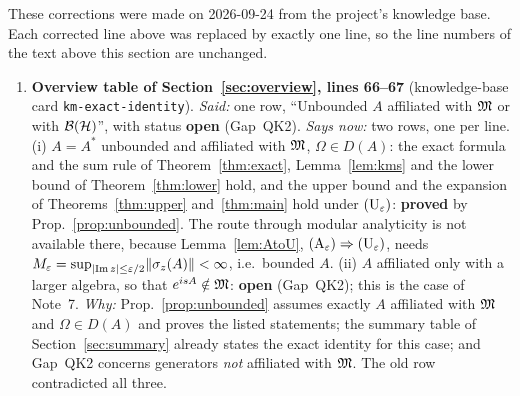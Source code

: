 \documentclass[11pt]{article}
\newcommand{\Hil}{\mathcal H}\newcommand{\Om}{\Omega}
\begin{document}
These corrections were made on 2026-09-24 from the project's knowledge base.  Each corrected line
above was replaced by exactly one line, so the line numbers of the text above this section are
unchanged.

\begin{enumerate}[leftmargin=2.4em,itemsep=4pt]
\item[\textbf{C1.}] \textbf{Overview table of Section~\ref{sec:overview}, lines 66--67}
 (knowledge-base card \texttt{km-exact-identity}).
 \emph{Said:} one row, ``Unbounded \(A\) affiliated with \(\mathfrak M\) or with \(\cB(\Hil)\)'', with
 status \textbf{open} (Gap~QK2).
 \emph{Says now:} two rows, one per line.  (i) \(A=A^*\) unbounded and affiliated with \(\mathfrak M\),
 \(\Om\in D(A)\): the exact formula and the sum rule of Theorem~\ref{thm:exact},
 Lemma~\ref{lem:kms} and the lower bound of Theorem~\ref{thm:lower} hold, and the upper bound and
 the expansion of Theorems~\ref{thm:upper} and~\ref{thm:main} hold under \((\mathrm U_\varepsilon)\):
 \textbf{proved} by Prop.~\ref{prop:unbounded}.  The route through modular analyticity is not
 available there, because Lemma~\ref{lem:AtoU}, \((\mathrm A_\varepsilon)\Rightarrow(\mathrm U_\varepsilon)\),
 needs \(M_\varepsilon=\sup_{\lvert\operatorname{Im}z\rvert\le\varepsilon/2}\lVert\sigma_z(A)\rVert<\infty\), i.e.\
 bounded \(A\).  (ii) \(A\) affiliated only with a larger algebra, so that
 \(e^{isA}\notin\mathfrak M\): \textbf{open} (Gap~QK2); this is the case of Note~7.
 \emph{Why:} Prop.~\ref{prop:unbounded} assumes exactly \(A\) affiliated with \(\mathfrak M\) and
 \(\Om\in D(A)\) and proves the listed statements; the summary table of
 Section~\ref{sec:summary} already states the exact identity for this case; and Gap~QK2 concerns
 generators \emph{not} affiliated with \(\mathfrak M\).  The old row contradicted all three.
\end{enumerate}
\end{document}
